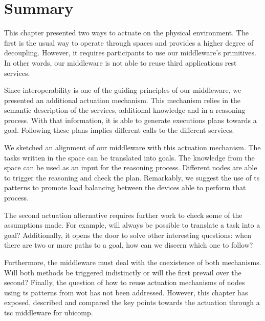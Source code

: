 \section{Summary}
\label{sec:actuation_summary}

This chapter presented two ways to actuate on the physical environment.
The first is the usual way to operate through spaces and provides a higher degree of decoupling.
However, it requires participants to use our middleware's primitives. %
In other words, our middleware is not able to reuse third applications \ac{rest} services.


Since interoperability is one of the guiding principles of our middleware, we presented an additional actuation mechanism.
This mechanism relies in the semantic description of the services, additional knowledge and in a reasoning process. %
With that information, it is able to generate executions plans towards a goal.
Following these plans implies different calls to the different services.


We sketched an alignment of our middleware with this actuation mechanism.
The tasks written in the space can be translated into goals.
The knowledge from the space can be used as an input for the reasoning process.
Different nodes are able to trigger the reasoning and check the plan.
Remarkably, we suggest the use of \ac{ts} patterns to promote load balancing between the devices able to perform that process.


The second actuation alternative requires further work to check some of the assumptions made.
For example, will always be possible to translate a task into a goal?
Additionally, it opens the door to solve other interesting questions: when there are two or more paths to a goal, how can we discern which one to follow?


Furthermore, the middleware must deal with the coexistence of both mechanisms.
Will both methods be triggered indistinctly or will the first prevail over the second?
Finally, the question of how to reuse actuation mechanisms of nodes using \ac{ts} patterns from \ac{wot} has not been addressed.
However, this chapter has exposed, described and compared the key points towards the actuation through a \ac{tsc} middleware for \ac{ubicomp}.